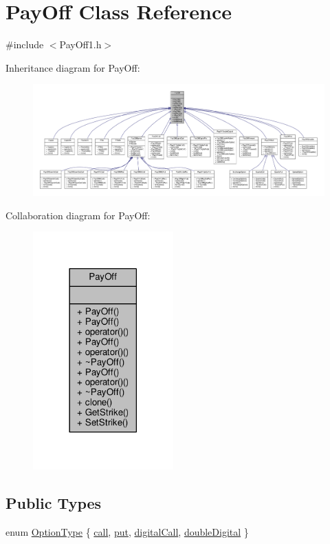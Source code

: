 \hypertarget{classPayOff}{}\section{Pay\+Off Class Reference}
\label{classPayOff}


{\ttfamily \#include $<$Pay\+Off1.\+h$>$}



Inheritance diagram for Pay\+Off\+:
\nopagebreak
\begin{figure}[H]
\begin{center}
\leavevmode
\includegraphics[width=350pt]{classPayOff__inherit__graph}
\end{center}
\end{figure}


Collaboration diagram for Pay\+Off\+:
\nopagebreak
\begin{figure}[H]
\begin{center}
\leavevmode
\includegraphics[width=153pt]{classPayOff__coll__graph}
\end{center}
\end{figure}
\subsection*{Public Types}
\begin{DoxyCompactItemize}
\item 
enum \hyperlink{classPayOff_a57262243a4bf56ddf5b78d7f563440c8}{Option\+Type} \{ \hyperlink{classPayOff_a57262243a4bf56ddf5b78d7f563440c8aad6767ec9b93244ffd4e14721eca7680}{call}, 
\hyperlink{classPayOff_a57262243a4bf56ddf5b78d7f563440c8adb6d4e9e109094df2a9c436b3df9c44b}{put}, 
\hyperlink{classPayOff_a57262243a4bf56ddf5b78d7f563440c8a2bb397a3598d77cef3de8770a380322c}{digital\+Call}, 
\hyperlink{classPayOff_a57262243a4bf56ddf5b78d7f563440c8a26293140c6f69e03ca018019fba51af1}{double\+Digital}
 \}
\end{DoxyCompactItemize}
